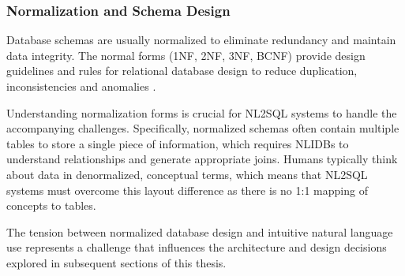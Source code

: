 \subsubsection{Normalization and Schema Design}

Database schemas are usually normalized to eliminate redundancy and maintain
data integrity. The normal forms (1NF, 2NF, 3NF, BCNF) provide design
guidelines and rules for relational database design to reduce duplication,
inconsistencies and anomalies \citep{DatabaseSystemIntro}.

Understanding normalization forms is crucial for NL2SQL systems to handle the
accompanying challenges. Specifically, normalized schemas often contain
multiple tables to store a single piece of information, which requires
NLIDBs to understand relationships and generate appropriate joins. Humans
typically think about data in denormalized, conceptual terms, which means that
NL2SQL systems must overcome this layout difference as there is no 1:1 mapping
of concepts to tables.

The tension between normalized database design and intuitive natural language
use represents a challenge that influences the architecture and design
decisions explored in subsequent sections of this thesis.
